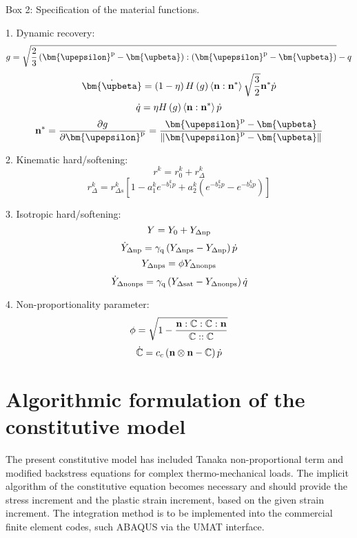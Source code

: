 \begin{framed}
\label{Box:1}
Box 2: Specification of the material functions.

1. Dynamic recovery:
\[g = \sqrt {\frac{2}{3}\left( {{{\bm{\upepsilon }}^{\rm{p}}} - {\bm{\upbeta}}} \right):\left( {{{\bm{\upepsilon }}^{\rm{p}}} - {\bm{\upbeta}}} \right)}  - q\]
\[{\dot{\bm{\upbeta}}}  = \left( {1 - \eta } \right)H\left( g \right)\left\langle {{\bf{n}}:{{\bf{n}}^*}} \right\rangle \sqrt {\frac{3}{2}} {{\bf{n}}^*}\dot p\]
\[\dot q = \eta H\left( g \right)\left\langle {{\bf{n}}:{{\bf{n}}^*}} \right\rangle \dot p\]
\[{{\bf{n}}^*} = \frac{{\partial g}}{{\partial {{\bm{\upepsilon }}^{\rm{p}}}}} = \frac{{{{\bm{\upepsilon }}^{\rm{p}}} - {\bm{\upbeta}}}}{{\left\| {{{\bm{\upepsilon }}^{\rm{p}}} - {\bm{\upbeta}}} \right\|}}\]

2. Kinematic hard/softening:
\[{r^k} = r_0^k + r_\Delta ^k\]
\[r_\Delta ^k = r_{\Delta s}^k\left[ {1 - a_1^k{e^{ - b_1^kp}} + a_2^k({e^{ - b_2^kp}} - {e^{ - b_3^kp}})} \right]\]

3. Isotropic hard/softening:
\[Y = {Y_0} + {Y_{\Delta \rm np}}\]
\[{\dot Y_{\Delta \rm np}} = {\gamma _{\rm q}}\left( {{Y_{\Delta \rm nps}} - {Y_{\Delta \rm np}}} \right)\dot p\]
\[{Y_{\Delta \rm nps}} = \phi {Y_{\Delta \rm nonps}}\]
\[{\dot Y_{\Delta \rm nonps}} = {\gamma _{\rm q}}\left( {{Y_{\Delta \rm sat}} - {Y_{\Delta \rm nonps}}} \right)\dot q\]


4. Non-proportionality parameter:
\[\phi  = \sqrt {1 - \frac{{{\bf{n}}:\mathbb{C}:\mathbb{C}:{\bf{n}}}}{{\mathbb{C}::\mathbb{C}}}} \]
\[\dot {\mathbb{C}} = {c_c}\left( {{\bf{n}} \otimes {\bf{n}} - \mathbb{C}} \right)\dot p\]

\end{framed}

\section{Algorithmic formulation of the constitutive model}
\noindent
The present constitutive model has included Tanaka non-proportional term and modified backstress equations for complex thermo-mechanical loads. The implicit algorithm of the constitutive equation becomes necessary and should provide the stress increment and the plastic strain increment, based on the given strain increment. The integration method is to be implemented into the commercial finite element codes, such ABAQUS via the UMAT interface.

